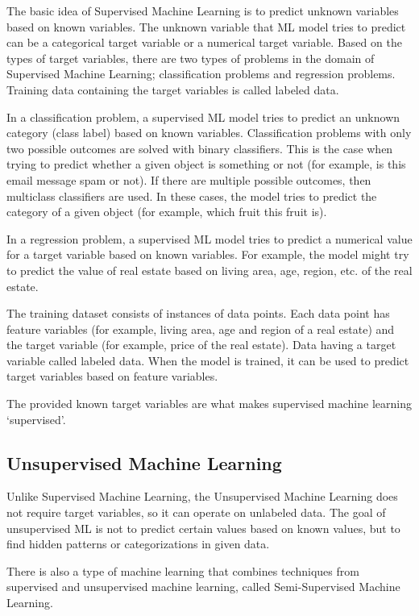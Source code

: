 The basic idea of Supervised Machine Learning is to predict unknown variables based on known variables. The unknown variable that ML model tries to predict can be a categorical target variable or a numerical target variable. Based on the types of target variables, there are two types of problems in the domain of Supervised Machine Learning; classification problems and regression problems. Training data containing the target variables is called labeled data.

In a classification problem, a supervised ML model tries to predict an unknown category (class label) based on known variables. Classification problems with only two possible outcomes are solved with binary classifiers. This is the case when trying to predict whether a given object is something or not (for example, is this email message spam or not). If there are multiple possible outcomes, then multiclass classifiers are used. In these cases, the model tries to predict the category of a given object (for example, which fruit this fruit is).

In a regression problem, a supervised ML model tries to predict a numerical value for a target variable based on known variables. For example, the model might try to predict the value of real estate based on living area, age, region, etc. of the real estate.

The training dataset consists of instances of data points. Each data point has feature variables (for example, living area, age and region of a real estate) and the target variable (for example, price of the real estate). Data having a target variable called labeled data. When the model is trained, it can be used to predict target variables based on feature variables.

The provided known target variables are what makes supervised machine learning `supervised'.\cite{ml}

\subsection{Unsupervised Machine Learning} \label{usml}

Unlike Supervised Machine Learning, the Unsupervised Machine Learning does not require target variables, so it can operate on unlabeled data. The goal of unsupervised ML is not to predict certain values based on known values, but to find hidden patterns or categorizations in given data.

There is also a type of machine learning that combines techniques from supervised and unsupervised machine learning, called Semi-Supervised Machine Learning.

